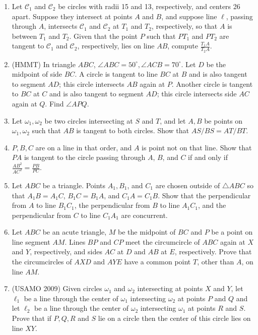 \documentclass[11pt]{article}
\begin{document}
\begin{enumerate}

\item Let $\mathcal{C}_1$ and $\mathcal{C}_2$ be circles with radii 15 and 13, respectively, and centers 26 apart. Suppose they intersect at points $A$ and $B$, and suppose line $\ell$, passing through $A$, intersects $\mathcal{C}_1$ and $\mathcal{C}_2$ at $T_1$ and $T_2$, respectively, so that $A$ is between $T_1$ and $T_2$. Given that the point $P$ such that $PT_1$ and $PT_2$ are tangent to $\mathcal{C}_1$ and $\mathcal{C}_2$, respectively, lies on line $AB$, compute $\frac{T_1 A}{T_2 A}$. 

\item (HMMT) In triangle $ABC$, $\angle ABC=50^{\circ}, \angle ACB=70^{\circ}$. Let $D$ be the midpoint of side $BC.$ A circle is tangent to line $BC$ at $B$ and is also tangent to segment $AD$; this circle intersects $AB$ again at $P$. Another circle is tangent to $BC$ at $C$ and is also tangent to segment $AD$; this circle intersects side $AC$ again at $Q$. Find $\angle APQ$. 

\item Let $\omega_1,\omega_2$ be two circles intersecting at $S$ and $T$, and let $A,B$ be points on $\omega_1,\omega_2$ such that $AB$ is tangent to both circles. Show that $AS/BS =AT/BT$.

\item $P, B, C$ are on a line in that order, and $A$ is point not on that line. Show that $PA$ is tangent to the circle passing through $A$, $B$, and $C$ if and only if $\frac{AB^2}{AC^2} = \frac{PB}{PC}$. 

\item Let $ABC$ be a triangle. Points $A_1, B_1$, and $C_1$ are chosen outside of $\triangle ABC$ so that $A_1B = A_1C$, $B_1 C = B_1 A$, and $C_1 A = C_1 B$. Show that the perpendicular from $A$ to line $B_1 C_1$, the perpendicular from $B$ to line $A_1 C_1$, and the perpendicular from $C$ to line $C_1 A_1$ are concurrent. 

\item Let $ABC$ be an acute triangle, $M$ be the midpoint of $BC$ and $P$ be a point on line segment $AM$. Lines $BP$ and $CP$ meet the circumcircle of $ABC$ again at $X$ and $Y$, respectively, and sides $AC$ at $D$ and $AB$ at $E$, respectively. Prove that the circumcircles of $AXD$ and $AYE$ have a common point $T$, other than $A$, on line $AM$. 

\item (USAMO 2009) Given circles $ \omega_1$ and $ \omega_2$ intersecting at points $X$ and $ Y$, let $\ell_1$ be a line through the center of $ \omega_1$ intersecting $ \omega_2$ at points $ P$ and $ Q$ and let $ \ell_2$ be a line through the center of $ \omega_2$ intersecting $ \omega_1$ at points $ R$ and $ S$. Prove that if $ P, Q, R$ and $ S$ lie on a circle then the center of this circle lies on line $ XY$. 


\end{enumerate}
\end{document}
